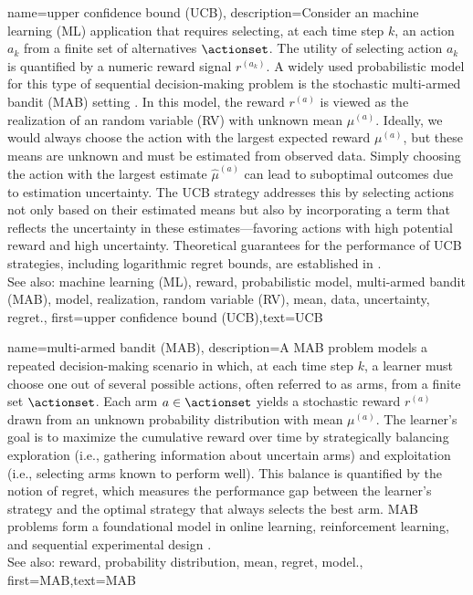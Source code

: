 {name={upper confidence bound (UCB)},
	description={Consider an machine learning (ML) 
		application that requires selecting, at each time step $k$, an action $a_{k}$ 
		from a finite set of alternatives $\actionset$. The utility of selecting action $a_{k}$ 
		is quantified by a numeric reward signal $r^{(a_{k})}$. 
		A widely used probabilistic model for this type of sequential decision-making problem 
		is the stochastic multi-armed bandit (MAB) setting \cite{Bubeck2012}. In this model, 
		the reward $r^{(a)}$ is viewed as the realization of an random variable (RV) 
		with unknown mean $\mu^{(a)}$. Ideally, we would always choose the 
		action with the largest expected reward $\mu^{(a)}$, but these 
		means are unknown and must be estimated from observed data. Simply 
		choosing the action with the largest estimate $\widehat{\mu}^{(a)}$ can 
		lead to suboptimal outcomes due to estimation uncertainty. The UCB strategy 
		addresses this by selecting actions not only based on their estimated means but 
		also by incorporating a term that reflects the uncertainty in these estimates—favoring 
		actions with high potential reward and high uncertainty. Theoretical guarantees 
		for the performance of UCB strategies, including logarithmic regret bounds, are established in \cite{Bubeck2012}.
					\\ 
		See also: machine learning (ML), reward, probabilistic model, multi-armed bandit (MAB), model, realization, random variable (RV), mean, data, uncertainty, regret.},
	first={upper confidence bound (UCB)},text={UCB} 
}

{name={multi-armed bandit (MAB)},
	description={A MAB problem models 
		a repeated decision-making scenario in which, at each time step $k$, a learner must 
		choose one out of several possible actions, often referred to as arms, from a finite 
		set $\actionset$. Each arm $a \in \actionset$ yields a stochastic reward $r^{(a)}$ 
		drawn from an unknown probability distribution with mean $\mu^{(a)}$. 
		The learner’s goal is to maximize the cumulative reward over time by 
		strategically balancing exploration (i.e., gathering information about 
		uncertain arms) and exploitation (i.e., selecting arms known to perform well). 
		This balance is quantified by the notion of regret, which measures the performance 
		gap between the learner's strategy and the optimal strategy that always selects the best arm. 
		MAB problems form a foundational model in online learning, reinforcement learning, 
		and sequential experimental design \cite{Bubeck2012}.
					\\ 
		See also: reward, probability distribution, mean, regret, model.},
	first={MAB},text={MAB}
}



